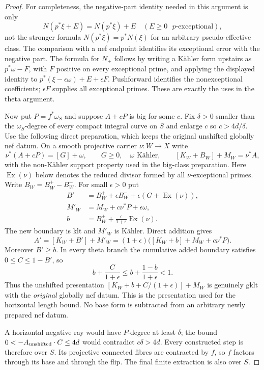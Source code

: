 \begin{proof}
For completeness, the negative-part identity needed in this argument
is only
\[
 N(p^*\xi+E)=N(p^*\xi)+E\quad(E\geq0\text{ $p$-exceptional}),
\]
not the stronger formula $N(p^*\xi)=p^*N(\xi)$ for an arbitrary
pseudo-effective class. The comparison with a nef endpoint identifies
its exceptional error with the negative part. The formula for
$N_+$ follows by writing a K\"ahler form upstairs as
$p^*\omega-F$, with $F$ positive on every exceptional prime, and applying
the displayed identity to
$p^*(\xi-\epsilon\omega)+E+\epsilon F$. Pushforward identifies the
nonexceptional coefficients; $\epsilon F$ supplies all exceptional
primes. These are exactly the uses in the theta argument.

Now put $P=f^*\omega_S$ and suppose $A+cP$ is big for some $c$.
Fix $\delta>0$ smaller than the $\omega_S$-degree of every compact
integral curve on $S$ and enlarge $c$ so $c>4d/\delta$.
Use the following direct preparation, which keeps the original
unshifted globally nef datum. On a smooth projective carrier
$\nu:W\to X$ write
\[
 \nu^*(A+cP)=[G]+\omega,\qquad G\geq0,\quad\omega\text{ K\"ahler},
 \qquad [K_W+B_W]+M_W=\nu^*A,
\]
with the non-K\"ahler support property used in the big-class
preparation. Here $\operatorname{Ex}(\nu)$ below denotes the reduced
divisor formed by all $\nu$-exceptional primes. Write
$B_W=B_W^+-B_W^-$. For small $\epsilon>0$ put
\[
 \begin{split}
 B'&=B_W^++\epsilon B_W^-+
                   \epsilon(G+\operatorname{Ex}(\nu)),\\
 M'_W&=M_W+c\nu^*P+\epsilon\omega,\\
 b&=B_W^++\frac{\epsilon}{1+\epsilon}\operatorname{Ex}(\nu).
 \end{split}
\]
The new boundary is klt and $M'_W$ is K\"ahler. Direct addition gives
\[
 A'=[K_W+B']+M'_W
   =(1+\epsilon)\bigl([K_W+b]+M_W+c\nu^*P\bigr).
\]
Moreover $B'\geq b$. In every theta branch the cumulative added
boundary satisfies $0\leq C\leq1-B'$, so
\[
 b+\frac{C}{1+\epsilon}
 \leq b+\frac{1-b}{1+\epsilon}<1.
\]
Thus the unshifted presentation
$[K_W+b+C/(1+\epsilon)]+M_W$ is genuinely gklt with the
\emph{original} globally nef datum. This is the presentation used
for the horizontal length bound. No base form is subtracted from
an arbitrary newly prepared nef datum.

A horizontal negative ray would have $P$-degree at least $\delta$;
the bound $0<-A_{\rm unshifted}\cdot C\leq4d$ would contradict
$c\delta>4d$. Every constructed step is therefore over $S$.
Its projective connected fibres are contracted by $f$, so $f$ factors
through its base and through the flip. The final finite extraction is
also over $S$.


\end{proof}
